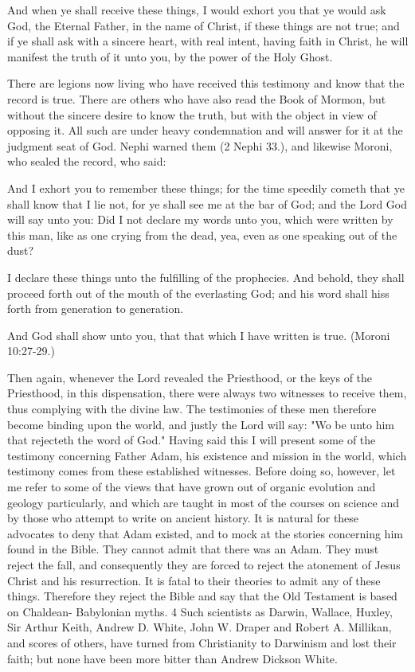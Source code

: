 And when ye shall receive these things, I would exhort you that ye would ask God, the
Eternal Father, in the name of Christ, if these things are not true; and if ye shall ask with a
sincere heart, with real intent, having faith in Christ, he will manifest the truth of it unto you,
by the power of the Holy Ghost.

There are legions now living who have received this testimony and know that the record is
true. There are others who have also read the Book of Mormon, but without the sincere desire
to know the truth, but with the object in view of opposing it. All such are under heavy
condemnation and will answer for it at the judgment seat of God. Nephi warned them (2
Nephi 33.), and likewise Moroni, who sealed the record, who said:

And I exhort you to remember these things; for the time speedily cometh that ye shall know
that I lie not, for ye shall see me at the bar of God; and the Lord God will say unto you: Did I
not declare my words unto you, which were written by this man, like as one crying from the
dead, yea, even as one speaking out of the dust?

I declare these things unto the fulfilling of the prophecies. And behold, they shall proceed
forth out of the mouth of the everlasting God; and his word shall hiss forth from generation
to generation.

And God shall show unto you, that that which I have written is true. (Moroni 10:27-29.)

Then again, whenever the Lord revealed the Priesthood, or the keys of the Priesthood, in this
dispensation, there were always two witnesses to receive them, thus complying with the
divine law. The testimonies of these men therefore become binding upon the world, and
justly the Lord will say: "Wo be unto him that rejecteth the word of God." Having said this I
will present some of the testimony concerning Father Adam, his existence and mission in the
world, which testimony comes from these established witnesses. Before doing so, however,
let me refer to some of the views that have grown out of organic evolution and geology
particularly, and which are taught in most of the courses on science and by those who attempt
to write on ancient history. It is natural for these advocates to deny that Adam existed, and to
mock at the stories concerning him found in the Bible. They cannot admit that there was an
Adam. They must reject the fall, and consequently they are forced to reject the atonement of
Jesus Christ and his resurrection. It is fatal to their theories to admit any of these things.
Therefore they reject the Bible and say that the Old Testament is based on Chaldean-
Babylonian myths. 4 Such scientists as Darwin, Wallace, Huxley, Sir Arthur Keith, Andrew
D. White, John W. Draper and Robert A. Millikan, and scores of others, have turned from
Christianity to Darwinism and lost their faith; but none have been more bitter than Andrew
Dickson White.

